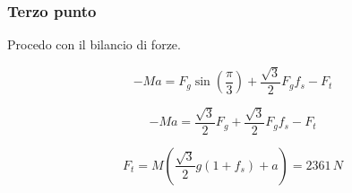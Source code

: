 \documentclass[main.tex]{subfiles}
\begin{document}
\subsubsection{Terzo punto}
Procedo con il bilancio di forze.

\begin{center}
\end{center}

\[
	-Ma = F_g\sin\left ( \dfrac{\pi}{3} \right ) + \dfrac{\sqrt{3}}{2}F_gf_s - F_t
\]

\[
	-Ma = \dfrac{\sqrt{3}}{2}F_g + \dfrac{\sqrt{3}}{2}F_gf_s - F_t
\]

\[
	F_t = M(\dfrac{\sqrt{3}}{2}g(1+f_s) + a) =2361\,N
\]
\end{document}
